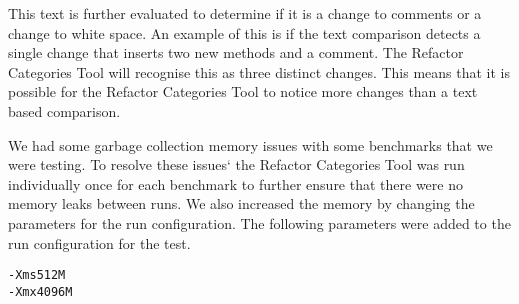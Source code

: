 % 
This text is further evaluated to determine if it is a change to comments or a change to white space. 
An example of this is if the text comparison detects a single change that inserts two new methods and a comment.  
The Refactor Categories Tool will recognise this as three distinct changes. 
This means that it is possible for the Refactor Categories Tool to notice more changes than a text based comparison. 

We had some garbage collection memory issues with some benchmarks that we were testing. 
To resolve these issues` the Refactor Categories Tool was run individually once for each benchmark to further ensure that there were no memory leaks between runs.
We also increased the memory by changing the parameters for the run configuration.  The following parameters were added to the run configuration for the test.

\begin{verbatim}
-Xms512M 
-Xmx4096M
\end{verbatim}



% 
% 
% 

